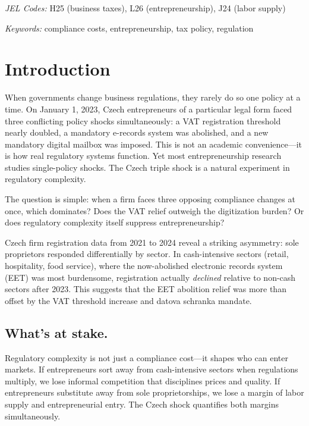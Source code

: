 \documentclass[12pt]{article}
\begin{document}
\noindent \textit{JEL Codes:} H25 (business taxes), L26 (entrepreneurship), J24 (labor supply)

\noindent \textit{Keywords:} compliance costs, entrepreneurship, tax policy, regulation

\vspace{2cm}


\section{Introduction}

When governments change business regulations, they rarely do so one policy at a time. On January 1, 2023, Czech entrepreneurs of a particular legal form faced three conflicting policy shocks simultaneously: a VAT registration threshold nearly doubled, a mandatory e-records system was abolished, and a new mandatory digital mailbox was imposed. This is not an academic convenience---it is how real regulatory systems function. Yet most entrepreneurship research studies single-policy shocks. The Czech triple shock is a natural experiment in regulatory complexity.

The question is simple: when a firm faces three opposing compliance changes at once, which dominates? Does the VAT relief outweigh the digitization burden? Or does regulatory complexity itself suppress entrepreneurship?

Czech firm registration data from 2021 to 2024 reveal a striking asymmetry: sole proprietors responded differentially by sector. In cash-intensive sectors (retail, hospitality, food service), where the now-abolished electronic records system (EET) was most burdensome, registration actually \emph{declined} relative to non-cash sectors after 2023. This suggests that the EET abolition relief was more than offset by the VAT threshold increase and datova schranka mandate.

\subsection*{What's at stake.} Regulatory complexity is not just a compliance cost---it shapes who can enter markets. If entrepreneurs sort away from cash-intensive sectors when regulations multiply, we lose informal competition that disciplines prices and quality. If entrepreneurs substitute away from sole proprietorships, we lose a margin of labor supply and entrepreneurial entry. The Czech shock quantifies both margins simultaneously.
\end{document}
